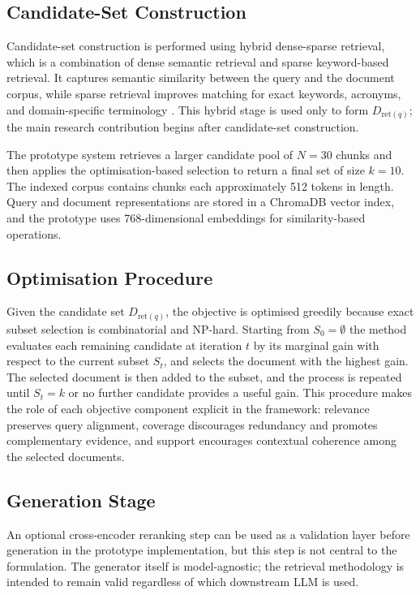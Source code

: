 \documentclass[conference]{IEEEtran}
\begin{document}
\subsection{Candidate-Set Construction}

Candidate-set construction is performed using hybrid dense-sparse retrieval, which is a combination of dense semantic retrieval and sparse keyword-based retrieval. It captures semantic similarity between the query and the document corpus, while sparse retrieval improves matching for exact keywords, acronyms, and domain-specific terminology \cite{5,6}. This hybrid stage is used only to form $D_{\mathrm{ret}(q)}$; the main research contribution begins after candidate-set construction.

The prototype system retrieves a larger candidate pool of $N = 30$ chunks and then applies the optimisation-based selection to return a final set of size $k = 10$. The indexed corpus contains chunks each approximately 512 tokens in length. Query and document representations are stored in a ChromaDB vector index, and the prototype uses 768-dimensional embeddings for similarity-based operations.

\subsection{Optimisation Procedure}

Given the candidate set $D_{\mathrm{ret}(q)}$, the objective is optimised greedily because exact subset selection is combinatorial and NP-hard. Starting from $S_0 = \emptyset$ the method evaluates each remaining candidate at iteration $t$ by its marginal gain with respect to the current subset $S_t$, and selects the document with the highest gain. The selected document is then added to the subset, and the process is repeated until $S_t = k$ or no further candidate provides a useful gain. This procedure makes the role of each objective component explicit in the framework: relevance preserves query alignment, coverage discourages redundancy and promotes complementary evidence, and support encourages contextual coherence among the selected documents.

\subsection{Generation Stage}

An optional cross-encoder reranking step can be used as a validation layer before generation in the prototype implementation, but this step is not central to the formulation. The generator itself is model-agnostic; the retrieval methodology is intended to remain valid regardless of which downstream LLM is used.
\end{document}
